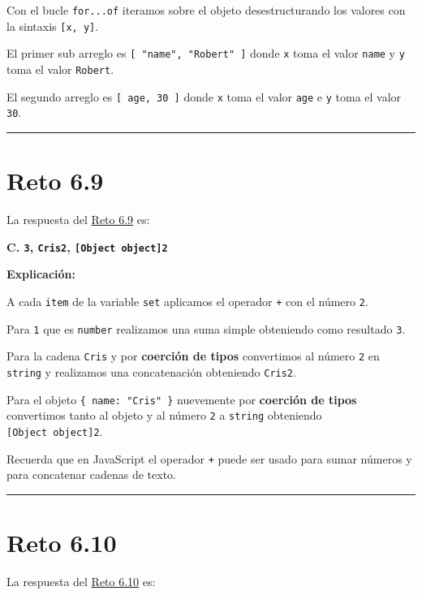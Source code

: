 \documentclass[
  letterpaper,
  DIV=11,
  numbers=noendperiod]{scrreprt}
\begin{document}
Con el bucle \texttt{for...of} iteramos sobre el objeto desestructurando
los valores con la sintaxis \texttt{{[}x,\ y{]}}.

El primer sub arreglo es \texttt{{[}\ "name",\ "Robert"\ {]}} donde
\texttt{x} toma el valor \texttt{name} y \texttt{y} toma el valor
\texttt{Robert}.

El segundo arreglo es
\texttt{{[}\ \textquotesingle{}age\textquotesingle{},\ 30\ {]}} donde
\texttt{x} toma el valor \texttt{age} e \texttt{y} toma el valor
\texttt{30}.

\begin{center}\rule{0.5\linewidth}{0.5pt}\end{center}

\section{Reto 6.9}\label{sec-sol-cap6-reto9}

La respuesta del \hyperref[sec-cap6-reto9]{Reto 6.9} es:

\textbf{C. \texttt{3}, \texttt{Cris2}, \texttt{{[}Object\ object{]}2}}

\textbf{Explicación:}

A cada \texttt{item} de la variable \texttt{set} aplicamos el operador
\texttt{+} con el número \texttt{2}.

Para \texttt{1} que es \texttt{number} realizamos una suma simple
obteniendo como resultado \texttt{3}.

Para la cadena \texttt{Cris} y por \textbf{coerción de tipos}
convertimos al número \texttt{2} en \texttt{string} y realizamos una
concatenación obteniendo \texttt{Cris2}.

Para el objeto \texttt{\{\ name:\ "Cris"\ \}} nuevemente por
\textbf{coerción de tipos} convertimos tanto al objeto y al número
\texttt{2} a \texttt{string} obteniendo \texttt{{[}Object\ object{]}2}.

Recuerda que en JavaScript el operador \texttt{+} puede ser usado para
sumar números y para concatenar cadenas de texto.

\begin{center}\rule{0.5\linewidth}{0.5pt}\end{center}

\section{Reto 6.10}\label{sec-sol-cap6-reto10}

La respuesta del \hyperref[sec-cap6-reto10]{Reto 6.10} es:
\end{document}
